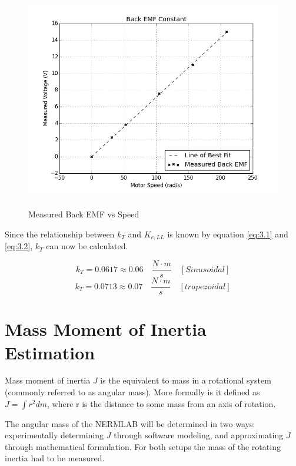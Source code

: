 \begin{figure}[htb]%
\begin{center}
    \includegraphics[height=3.8in]{figures/back_emf_plot.png}

    \caption[Measured Back EMF vs Speed]{Measured Back EMF vs Speed}

    \label{back_emf_plot}
\end{center}
\end{figure}

Since the relationship between \(k_T\) and \(K_{e,LL}\) is known by equation \ref{eq:3.1} and \ref{eq:3.2}, \(k_T\) can now be calculated.
\begin{tcolorbox}[
    standard jigsaw,
    opacityback=0]
\[k_T = 0.0617 \approx 0.06 \quad \frac{N \cdot m}{s} \quad [Sinusoidal]\]
\[k_T =  0.0713 \approx 0.07 \quad  \frac{N \cdot m}{s} \quad [trapezoidal]\]
\end{tcolorbox}

\newpage
\section{Mass Moment of Inertia Estimation}
Mass moment of inertia \(J\) is the equivalent to mass in a rotational system (commonly referred to as angular mass). More formally is it defined as \(J = \int r^2 dm\), where r is the distance to some mass from an axis of rotation.

The angular mass of the NERMLAB will be determined in two ways: experimentally determining \(J\) through software modeling, and approximating \(J\) through mathematical formulation. For both setups the mass of the rotating inertia had to be measured.

